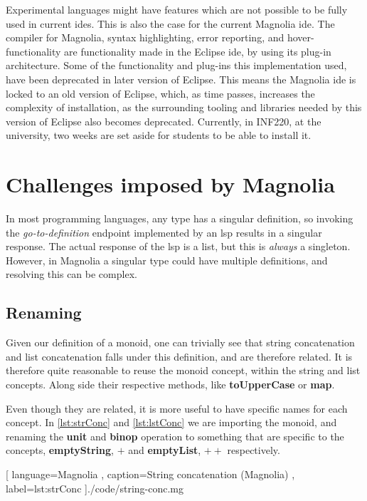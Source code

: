 Experimental languages might have features which are not possible to be fully
used in current \gls*{ide}s. This is also the case for the current Magnolia
\gls*{ide}. The compiler for Magnolia, syntax highlighting, error reporting, and
hover-functionality are functionality made in the Eclipse \gls*{ide}, by using
its plug-in architecture. Some of the functionality and plug-ins this
implementation used, have been deprecated in later version of Eclipse. This
means the Magnolia \gls*{ide} is locked to an old version of Eclipse, which, as
time passes, increases the complexity of installation, as the surrounding
tooling and libraries needed by this version of Eclipse also becomes deprecated.
Currently, in INF220, at the university, two weeks are set aside for students to
be able to install it.

\section{Challenges imposed by Magnolia}

In most programming languages, any type has a singular definition, so invoking
the \textit{go-to-definition} endpoint implemented by an \gls*{lsp} results in a
singular response. The actual response of the \gls*{lsp} is a list, but this is
\textit{always} a singleton. However, in Magnolia a singular type could have
multiple definitions, and resolving this can be complex.

\subsection{Renaming}

Given our definition of a monoid,\footnotemark[13]{} one can trivially see that
string concatenation and list concatenation falls under this definition, and are
therefore related. It is therefore quite reasonable to reuse the monoid
concept, within the string and list concepts. Along side their respective
methods, like \textbf{toUpperCase} or \textbf{map}.

Even though they are related, it is more useful to have specific names for each
concept. In \ref{lst:strConc} and \ref{lst:lstConc} we are importing the
monoid\footnotemark{}, and renaming the \textbf{unit} and \textbf{binop}
operation to something that are specific to the concepts, \textbf{emptyString},
$+$ and \textbf{emptyList}, $++$ respectively.


\begin{center}
  
    [ language=Magnolia
    , caption={String concatenation (Magnolia)}
    , label=lst:strConc
    ]{./code/string-conc.mg}
\end{center}

